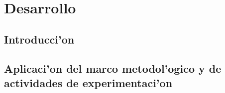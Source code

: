\chapter{Desarrollo}
\section*{Introducci'on}
\section{Aplicaci'on del marco metodol'ogico y de actividades de experimentaci'on}
